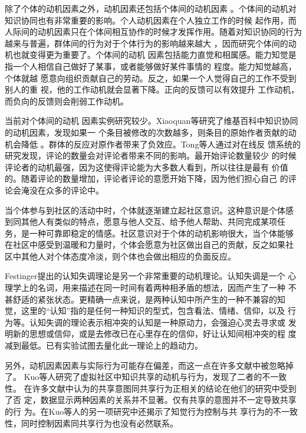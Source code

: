 除了个体的动机因素之外，动机因素还包括个体间的动机因素
\cite{Hackman1975,Hackman1980}。个体间的动机对知识协同也有非常重要的影响。个人动机因素在个人独立工作的时候
起作用，而人际间的动机因素只在个体间相互协作的时候才发挥作用。随着对知识协同的行为越来与普遍，群体间的行为对于个体行为的影响越来越大
，因而研究个体间的动机也就变得更为重要了。个体间的动机
因素包括能力直觉和相属感。能力知觉是指一个人相信自己做好了某事，或者能够做好某件事情的
程度\cite{harter1981nsr,bandura1982sem}。能力知觉越高，个体就越
愿意向组织贡献自己的劳动。反之，如果一个人觉得自己的工作不受到别人的重
视，他的工作动机就会显著下降\cite{Hertel2003}。正向的反馈可以有效提升
工作动机，而负向的反馈则会削弱工作动机。


当前对个体间的动机
因素实例研究较少。Xiaoquan等研究了维基百科中知识协同的动机因素，发现如果一
个条目被修改的次数越多，则条目的原始作者贡献的动机会降低
\cite{Zhang2006}。群体的反应对原作者带来了负效应。Tong等人通过对在线反
馈系统的研究发现，评论的数量会对评论者带来不同的影响。最开始评论数量较少
的时候评论者的动机最强，因为这使得评论能为大多数人看到，所以往往是最有
价值的。随着评论的数量增加，评论者评论的意愿开始下降，因为他们担心自己
的评论会淹没在众多的评论中\cite{tong2007uii}。

当个体参与到社区的活动中时，个体就逐渐建立起社区意识。这种意识是个体感
到同其他人有类似的特点，愿意与他人交互、给予他人帮助、共同完成某项任
务，是一种可靠即稳定的情感\cite{mcmillan1986sense}。社区意识对于个体的动机影响很大，当个体能够
在社区中感受到温暖和力量时，个体会愿意为社区做出自己的贡献，反之如果社
区中其他人对个体态度冷淡，则个体也会做出相应的负面反应。








Festinger提出的认知失调理论是另一个非常重要的动机理论。认知失调是一个
心理学上的名词，用来描述在同一时间有着两种相矛盾的想法，因而产生了一种
不甚舒适的紧张状态。更精确一点来说，是两种认知中所产生的一种不兼容的知
觉，这里的“认知”指的是任何一种知识的型式，包含看法、情绪、信仰，以及
行为等。认知失调的理论表示相冲突的认知是一种原动力，会强迫心灵去寻求或
发明新的思想或信仰，或是去修改已在心里存在的信仰，好让认知间相冲突的程
度减到最低。已有实验试图去量化此一理论上的趋动力\cite{aronson1969tcd}。

另外，动机因素因素与实际行为可能存在偏差，而这一点在许多文献中被忽略掉
了。 Kuo等人研究了虚拟社区中知识共享的动机与行为，发现了二者的不一致性。
在许多文献中认为的共享意图同共享行为正相关的结论在他们的研究中受到了否
定，数据显示两种因素的关系并不显著。仅有共享的意图并不一定导致共享的行
为\cite{Kuowiley2008}。在Kuo等人的另一项研究中还揭示了知觉行为控制与共
享行为的不一致性，同时控制因素同共享行为也没有必然联系\cite{Kuo2008}。




